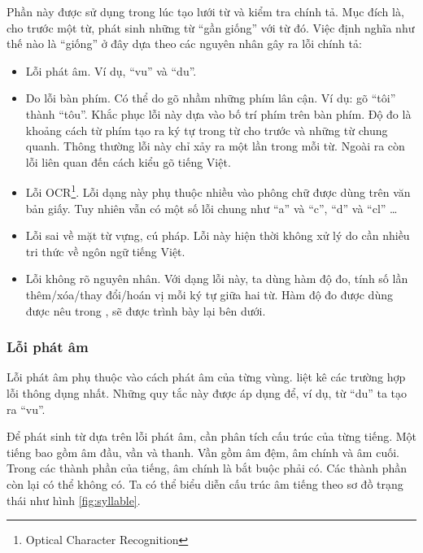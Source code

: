 \documentclass[a4paper,oneside]{book} %
\newcommand{\note}[1]{\underline{#1}}
\begin{document}
Phần này được sử dụng trong lúc tạo lưới từ và kiểm tra chính
tả. Mục đích là, cho trước một từ, phát sinh những từ ``gần giống''
với từ đó. Việc định nghĩa như thế nào là ``giống'' ở đây dựa theo các
nguyên nhân gây ra lỗi chính tả:
\begin{itemize}
\item Lỗi phát âm. Ví dụ, ``vu'' và ``du''. 
\item Do lỗi bàn phím. Có thể do gõ nhầm những phím lân cận. Ví dụ: gõ
  ``tôi'' thành ``tôu''. Khắc phục lỗi này dựa vào bố trí phím trên
  bàn phím. Độ đo là khoảng cách từ phím tạo ra ký tự trong từ cho
  trước và những từ chung quanh. Thông thường lỗi này chỉ xảy ra một
  lần trong mỗi từ. Ngoài ra còn lỗi liên quan đến cách kiểu gõ tiếng
  Việt.
\item Lỗi OCR\footnote{Optical Character Recognition}. Lỗi dạng này
  phụ thuộc nhiều vào phông chữ được dùng trên văn bản giấy. Tuy nhiên
  vẫn có một số lỗi chung như ``a'' và ``c'', ``d'' và ``cl'' \ldots
\item Lỗi sai về mặt từ vựng, cú pháp. Lỗi này hiện thời không xử lý
  do cần nhiều tri thức về ngôn ngữ tiếng Việt.
\item Lỗi không rõ nguyên nhân. Với dạng lỗi này, ta dùng hàm độ đo,
  tính số lần thêm/xóa/thay đổi/hoán vị mỗi ký tự giữa hai từ. Hàm độ đo
  được dùng được nêu trong \cite{Oflazer}, sẽ được trình bày lại bên
  dưới.
\end{itemize}


\subsubsection{Lỗi phát âm}

Lỗi phát âm phụ thuộc vào cách phát âm của từng
vùng. \cite{LoiChinhTa} liệt kê các trường hợp lỗi thông dụng
nhất. Những quy tắc này được áp dụng để, ví dụ, từ   ``du'' ta tạo ra
``vu''. 

Để phát sinh từ dựa trên lỗi phát âm, cần phân tích cấu trúc của từng
tiếng. Một tiếng bao gồm âm đầu, vần và thanh. Vần gồm âm đệm, âm
chính và âm cuối. Trong các thành phần của tiếng, âm chính là bắt buộc
phải có. Các thành phần còn lại có thể không có. Ta có thể biểu diễn
cấu trúc âm tiếng theo sơ đồ trạng thái như hình \ref{fig:syllable}.
\end{document}
